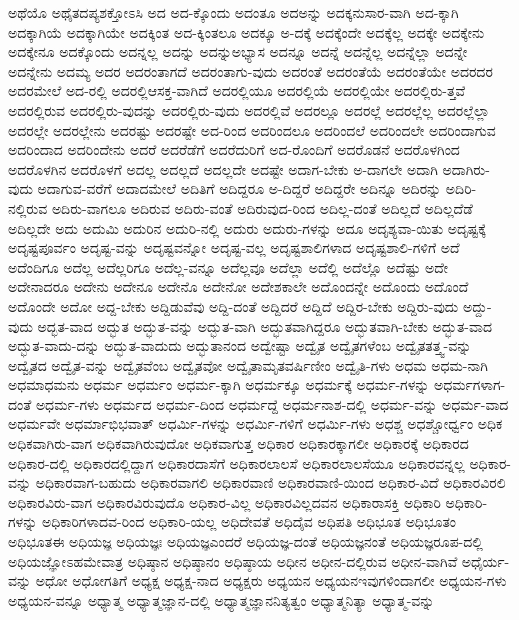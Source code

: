 {ಅಥೆಯೊ
ಅಥೈತದಪ್ಯಶಕ್ತೋಽಸಿ
ಅದ
ಅದ-ಕ್ಕೊಂದು
ಅದಂತೂ
ಅದಅನ್ನು
ಅದಕ್ಕನುಸಾರ-ವಾಗಿ
ಅದ-ಕ್ಕಾಗಿ
ಅದಕ್ಕಾಗಿಯೆ
ಅದಕ್ಕಾಗಿಯೇ
ಅದಕ್ಕಿಂತ
ಅದ-ಕ್ಕಿಂತಲೂ
ಅದಕ್ಕೂ
ಅ-ದಕ್ಕೆ
ಅದಕ್ಕೆಂದೇ
ಅದಕ್ಕೆಲ್ಲ
ಅದಕ್ಕೇ
ಅದಕ್ಕೇನು
ಅದಕ್ಕೇನೂ
ಅದಕ್ಕೊಂದು
ಅದನ್ನಲ್ಲ
ಅದನ್ನು
ಅದನ್ನುಅಭ್ಯಾಸ
ಅದನ್ನೂ
ಅದನ್ನೆ
ಅದನ್ನೆಲ್ಲ
ಅದನ್ನೆಲ್ಲಾ
ಅದನ್ನೇ
ಅದನ್ನೇನು
ಅದಮ್ಯ
ಅದರ
ಅದರಂತಾಗದೆ
ಅದರಂತಾಗು-ವುದು
ಅದರಂತೆ
ಅದರಂತೆಯೆ
ಅದರಂತೆಯೇ
ಅದರದರ
ಅದರಮೇಲೆ
ಅದ-ರಲ್ಲಿ
ಅದರಲ್ಲಿಆಸಕ್ತ-ವಾಗಿದೆ
ಅದರಲ್ಲಿಯೂ
ಅದರಲ್ಲಿಯೆ
ಅದರಲ್ಲಿಯೇ
ಅದರಲ್ಲಿರು-ತ್ತವೆ
ಅದರಲ್ಲಿರುವ
ಅದರಲ್ಲಿರು-ವುದನ್ನು
ಅದರಲ್ಲಿರು-ವುದು
ಅದರಲ್ಲಿವೆ
ಅದರಲ್ಲೂ
ಅದರಲ್ಲೆ
ಅದರಲ್ಲೆಲ್ಲ
ಅದರಲ್ಲೆಲ್ಲಾ
ಅದರಲ್ಲೇ
ಅದರಲ್ಲೇನು
ಅದರಷ್ಟು
ಅದರಷ್ಟೇ
ಅದ-ರಿಂದ
ಅದರಿಂದಲೂ
ಅದರಿಂದಲೆ
ಅದರಿಂದಲೇ
ಅದರಿಂದಾಗುವ
ಅದರಿಂದಾದ
ಅದರಿಂದೇನು
ಅದರೆ
ಅದರೆಡೆಗೆ
ಅದರೆದುರಿಗೆ
ಅದ-ರೊಂದಿಗೆ
ಅದರೊಡನೆ
ಅದರೊಳಗಿಂದ
ಅದರೊಳಗಿನ
ಅದರೊಳಗೆ
ಅದಲ್ಲ
ಅದಲ್ಲದೆ
ಅದಲ್ಲದೇ
ಅದಷ್ಟೇ
ಅದಾಗ-ಬೇಕು
ಅ-ದಾಗಲೇ
ಅದಾಗಿ
ಅದಾಗಿರು-ವುದು
ಅದಾಗುವ-ವರೆಗೆ
ಅದಾದಮೇಲೆ
ಅದಿತಿಗೆ
ಅದಿದ್ದರೂ
ಅ-ದಿದ್ದರೆ
ಅದಿದ್ದರೇ
ಅದಿನ್ನೂ
ಅದಿರನ್ನು
ಅದಿರಿ-ನಲ್ಲಿರುವ
ಅದಿರು-ವಾಗಲೂ
ಅದಿರುವ
ಅದಿರು-ವಂತೆ
ಅದಿರುವುದ-ರಿಂದ
ಅದಿಲ್ಲ-ದಂತೆ
ಅದಿಲ್ಲದೆ
ಅದಿಲ್ಲದೆಡೆ
ಅದಿಲ್ಲದೇ
ಅದು
ಅದುಮಿ
ಅದುರಿನ
ಅದುರಿ-ನಲ್ಲಿ
ಅದುರು
ಅದುರು-ಗಳನ್ನು
ಅದೂ
ಅದೃಶ್ಯವಾ-ಯಿತು
ಅದೃಷ್ಟಕ್ಕೆ
ಅದೃಷ್ಟಪೂರ್ವಂ
ಅದೃಷ್ಟ-ವನ್ನು
ಅದೃಷ್ಟವನ್ನೋ
ಅದೃಷ್ಟ-ವಲ್ಲ
ಅದೃಷ್ಟಶಾಲಿಗಳಾದ
ಅದೃಷ್ಟಶಾಲಿ-ಗಳಿಗೆ
ಅದೆ
ಅದೆಂದಿಗೂ
ಅದೆಲ್ಲ
ಅದೆಲ್ಲರಿಗೂ
ಅದೆಲ್ಲ-ವನ್ನೂ
ಅದೆಲ್ಲವೂ
ಅದೆಲ್ಲಾ
ಅದೆಲ್ಲಿ
ಅದೆಲ್ಲೊ
ಅದೆಷ್ಟು
ಅದೇ
ಅದೇನಾದರೂ
ಅದೇನು
ಅದೇನೂ
ಅದೇನೊ
ಅದೇನೋ
ಅದೇಶಕಾಲೇ
ಅದೊಂದನ್ನೇ
ಅದೊಂದು
ಅದೊಂದೆ
ಅದೊಂದೇ
ಅದೋ
ಅದ್ದ-ಬೇಕು
ಅದ್ದಿಡುವೆವು
ಅದ್ದಿ-ದಂತೆ
ಅದ್ದಿದರೆ
ಅದ್ದಿದೆ
ಅದ್ದಿರ-ಬೇಕು
ಅದ್ದಿರು-ವುದು
ಅದ್ದು-ವುದು
ಅದ್ಭತ-ವಾದ
ಅದ್ಭುತ
ಅದ್ಭುತ-ವನ್ನು
ಅದ್ಭುತ-ವಾಗಿ
ಅದ್ಭುತವಾಗಿದ್ದರೂ
ಅದ್ಭುತವಾಗಿ-ಬೇಕು
ಅದ್ಭುತ-ವಾದ
ಅದ್ಭುತ-ವಾದು-ದನ್ನು
ಅದ್ಭುತ-ವಾದುದು
ಅದ್ಭುತಾನಂದ
ಅದ್ವೇಷ್ಟಾ
ಅದ್ವೈತ
ಅದ್ವೈತಗಳೆಂಬ
ಅದ್ವೈತತತ್ತ್ವ-ವನ್ನು
ಅದ್ವೈತದ
ಅದ್ವೈತ-ವನ್ನು
ಅದ್ವೈತವೆಂಬ
ಅದ್ವೈತವೋ
ಅದ್ವೈತಾಮೃತವರ್ಷಿಣೀಂ
ಅದ್ವೈತಿ-ಗಳು
ಅಧಮ
ಅಧಮ-ನಾಗಿ
ಅಧಮಾಧಮನು
ಅಧರ್ಮ
ಅಧರ್ಮಂ
ಅಧರ್ಮ-ಕ್ಕಾಗಿ
ಅಧರ್ಮಕ್ಕೂ
ಅಧರ್ಮಕ್ಕೆ
ಅಧರ್ಮ-ಗಳನ್ನು
ಅಧರ್ಮಗಳಾಗ-ದಂತೆ
ಅಧರ್ಮ-ಗಳು
ಅಧರ್ಮದ
ಅಧರ್ಮ-ದಿಂದ
ಅಧರ್ಮದ್ದೆ
ಅಧರ್ಮನಾಶ-ದಲ್ಲಿ
ಅಧರ್ಮ-ವನ್ನು
ಅಧರ್ಮ-ವಾದ
ಅಧರ್ಮವೇ
ಅಧರ್ಮಾಭಿಭವಾತ್
ಅಧರ್ಮಿ-ಗಳನ್ನು
ಅಧರ್ಮಿ-ಗಳಿಗೆ
ಅಧರ್ಮಿ-ಗಳು
ಅಧಶ್ಚ
ಅಧಶ್ಚೋರ್ಧ್ವಂ
ಅಧಿಕ
ಅಧಿಕವಾಗಿರು-ವಾಗ
ಅಧಿಕವಾಗಿರುವುದೋ
ಅಧಿಕವಾಗುತ್ತ
ಅಧಿಕಾರ
ಅಧಿಕಾರಕ್ಕಾಗಲೀ
ಅಧಿಕಾರಕ್ಕೆ
ಅಧಿಕಾರದ
ಅಧಿಕಾರ-ದಲ್ಲಿ
ಅಧಿಕಾರದಲ್ಲಿದ್ದಾಗ
ಅಧಿಕಾರದಾಸೆಗೆ
ಅಧಿಕಾರಲಾಲಸೆ
ಅಧಿಕಾರಲಾಲಸೆಯೂ
ಅಧಿಕಾರವನ್ನಲ್ಲ
ಅಧಿಕಾರ-ವನ್ನು
ಅಧಿಕಾರವಾಗ-ಬಹುದು
ಅಧಿಕಾರವಾಗಲಿ
ಅಧಿಕಾರವಾಣಿ
ಅಧಿಕಾರವಾಣಿ-ಯಿಂದ
ಅಧಿಕಾರ-ವಿದೆ
ಅಧಿಕಾರವಿರಲಿ
ಅಧಿಕಾರವಿರು-ವಾಗ
ಅಧಿಕಾರವಿರುವುದೊ
ಅಧಿಕಾರ-ವಿಲ್ಲ
ಅಧಿಕಾರವಿಲ್ಲದವನ
ಅಧಿಕಾರಾಸಕ್ತಿ
ಅಧಿಕಾರಿ
ಅಧಿಕಾರಿ-ಗಳನ್ನು
ಅಧಿಕಾರಿಗಳಾದವ-ರಿಂದ
ಅಧಿಕಾರಿ-ಯಲ್ಲ
ಅಧಿದೇವತೆ
ಅಧಿದೈವ
ಅಧಿಪತಿ
ಅಧಿಭೂತ
ಅಧಿಭೂತಂ
ಅಧಿಭೂತಈ
ಅಧಿಯಜ್ಞ
ಅಧಿಯಜ್ಞಃ
ಅಧಿಯಜ್ಞಎಂದರೆ
ಅಧಿಯಜ್ಞ-ದಂತೆ
ಅಧಿಯಜ್ಞನಂತೆ
ಅಧಿಯಜ್ಞರೂಪ-ದಲ್ಲಿ
ಅಧಿಯಜ್ಞೋಽಹಮೇವಾತ್ರ
ಅಧಿಷ್ಠಾನ
ಅಧಿಷ್ಠಾನಂ
ಅಧಿಷ್ಠಾಯ
ಅಧೀನ
ಅಧೀನ-ದಲ್ಲಿರುವ
ಅಧೀನ-ವಾಗಿವೆ
ಅಧೈರ್ಯ-ವನ್ನು
ಅಧೋ
ಅಧೋಗತಿಗೆ
ಅಧ್ಯಕ್ಷ
ಅಧ್ಯಕ್ಷ-ನಾದ
ಅಧ್ಯಕ್ಷರು
ಅಧ್ಯಯನ
ಅಧ್ಯಯನಇವುಗಳಿಂದಾಗಲೀ
ಅಧ್ಯಯನ-ಗಳು
ಅಧ್ಯಯನ-ವನ್ನೂ
ಅಧ್ಯಾತ್ಮ
ಅಧ್ಯಾತ್ಮಜ್ಞಾನ-ದಲ್ಲಿ
ಅಧ್ಯಾತ್ಮಜ್ಞಾನನಿತ್ಯತ್ವಂ
ಅಧ್ಯಾತ್ಮನಿತ್ಯಾ
ಅಧ್ಯಾತ್ಮ-ವನ್ನು
}
